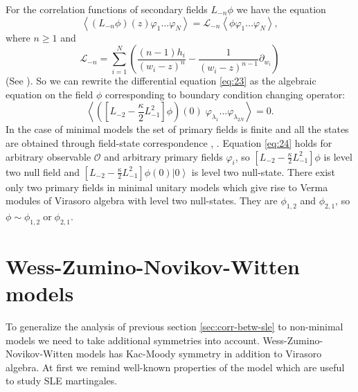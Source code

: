 \documentclass[a4paper]{jpconf}
\theoremstyle{definition}
\theoremstyle{definition} \newtheorem{Def}{Definition}
\begin{document}
For the correlation functions of secondary fields $L_{-n}\phi$ we have the equation 
\begin{equation}
\left< (L_{-n}\phi)(z) \varphi_{1}\dots \varphi_{N}\right>=\mathcal{L}_{-n}\left<\phi\varphi_{1}\dots\varphi_{N}\right>,
\end{equation}
 where $n\geq 1$ and
\begin{equation*}
  \mathcal{L}_{-n}=\sum_{i=1}^{N} \left(\frac{(n-1)h_{i}}{(w_{i}-z)^{n}} -\frac{1}{(w_{i}-z)^{n-1}}\partial_{w_{i}}\right)
\end{equation*}
(See \cite{difrancesco1997cft}). So we can rewrite the differential equation \eqref{eq:23} as the algebraic equation on the field $\phi$ corresponding to boundary condition changing operator:
\begin{equation}
  \label{eq:24}
   \left<\left([L_{-2}-\frac{\kappa}{2}L_{-1}^{2}]\phi\right)(0)\; \varphi_{\lambda_{1}}\dots \varphi_{\lambda_{{2N}}}\right>=0.
\end{equation}
In the case of minimal models the set of primary fields is finite and all the states are obtained through field-state correspondence \cite{belavin1984ics}, \cite{difrancesco1997cft}. 
Equation \eqref{eq:24}  holds for arbitrary observable $\mathcal{O}$ and arbitrary primary fields $\varphi_{i}$, so $[L_{-2}-\frac{\kappa}{2}L_{-1}^{2}]\phi$ is level two null field and $[L_{-2}-\frac{\kappa}{2}L_{-1}^{2}]\phi(0)\left|0\right>$ is level two null-state. There exist only two primary fields in minimal unitary models which give rise to Verma modules of Virasoro algebra with level two null-states. They are $\phi_{1,2}$ and $\phi_{2,1}$, so $\phi\sim \phi_{1,2} \;\text{or}\; \phi_{2,1}$. 

\section{Wess-Zumino-Novikov-Witten models}
\label{sec:sle-wzw-models}
To generalize the analysis of previous section \ref{sec:corr-betw-sle} to non-minimal models we need to take additional symmetries into account. Wess-Zumino-Novikov-Witten models has Kac-Moody symmetry in addition to Virasoro algebra. At first we remind well-known properties of the model \cite{difrancesco1997cft} which are useful to study SLE martingales. 
\end{document}
